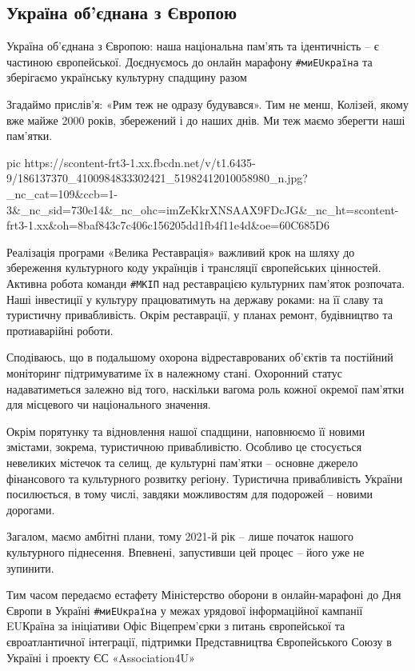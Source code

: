  
 
 
 
 
\subsection{Україна об'єднана з Європою}
\label{sec:12_05_2021.fb.tkachenko_aleksandr.1.ukraina_eu}

Україна об'єднана з Європою: наша національна пам'ять та ідентичність – є
частиною європейської. Доєднуємось до онлайн марафону \verb|#миEUкраїна| та зберігаємо
українську культурну спадщину разом 

Згадаймо прислів'я: «Рим теж не одразу будувався». Тим не менш, Колізей, якому
вже майже 2000 років, збережений і до наших днів. Ми теж маємо зберегти наші
пам'ятки.

\ifcmt
  pic https://scontent-frt3-1.xx.fbcdn.net/v/t1.6435-9/186137370_4100984833302421_51982412010058980_n.jpg?_nc_cat=109&ccb=1-3&_nc_sid=730e14&_nc_ohc=imZeKkrXNSAAX9FDcJG&_nc_ht=scontent-frt3-1.xx&oh=8baf843c7c406c156205dd1fb4f11e4d&oe=60C685D6
\fi

Реалізація  програми «Велика Реставрація» важливий крок на шляху до збереження
культурного коду українців і трансляції європейських цінностей. Активна робота
команди \verb|#МКІП| над реставрацією культурних пам'яток розпочата. Наші інвестиції у
культуру працюватимуть на державу роками: на її славу та туристичну
привабливість. Окрім реставрації, у планах ремонт, будівництво та протиаварійні
роботи. 

Сподіваюсь, що в подальшому охорона відреставрованих об'єктів та постійний
моніторинг підтримуватиме їх в належному стані. Охоронний статус надаватиметься
залежно від того, наскільки вагома роль кожної окремої пам'ятки для місцевого
чи національного значення.

Окрім порятунку та відновлення нашої спадщини, наповнюємо її новими змістами,
зокрема, туристичною привабливістю. Особливо це стосується невеликих містечок
та селищ, де культурні пам'ятки – основне джерело фінансового та культурного
розвитку регіону. Туристична привабливість України посилюється, в тому числі,
завдяки можливостям для подорожей – новими дорогами.

Загалом, маємо амбітні плани, тому 2021-й рік – лише початок нашого культурного
піднесення. Впевнені, запустивши цей процес – його уже не зупинити.

Тим часом передаємо естафету Міністерство оборони в онлайн-марафоні до Дня
Європи в Україні \verb|#миEUкраїна| у межах урядової інформаційної кампанії EUКраїна
за ініціативи Офіс Віцепрем'єрки з питань європейської та євроатлантичної
інтеграції, підтримки Представництва Європейського Союзу в Україні і проекту ЄС
«Association4U»


